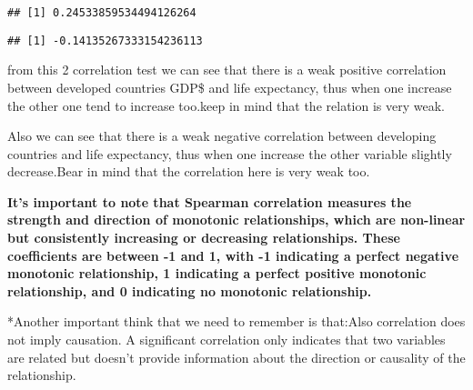 \documentclass[
]{article}
\newenvironment{Shaded}{\begin{snugshade}}{\end{snugshade}}
\newcommand{\AttributeTok}[1]{\textcolor[rgb]{0.13,0.29,0.53}{#1}}
\newcommand{\FunctionTok}[1]{\textcolor[rgb]{0.13,0.29,0.53}{\textbf{#1}}}
\newcommand{\NormalTok}[1]{#1}
\newcommand{\SpecialCharTok}[1]{\textcolor[rgb]{0.81,0.36,0.00}{\textbf{#1}}}
\newcommand{\StringTok}[1]{\textcolor[rgb]{0.31,0.60,0.02}{#1}}
\begin{document}
\begin{Shaded}
\end{Shaded}

\begin{verbatim}
## [1] 0.24533859534494126264
\end{verbatim}

\begin{Shaded}
\end{Shaded}

\begin{verbatim}
## [1] -0.14135267333154236113
\end{verbatim}

from this 2 correlation test we can see that there is a weak positive
correlation between developed countries GDP\$ and life expectancy, thus
when one increase the other one tend to increase too.keep in mind that
the relation is very weak.

Also we can see that there is a weak negative correlation between
developing countries and life expectancy, thus when one increase the
other variable slightly decrease.Bear in mind that the correlation here
is very weak too.

\textbf{It's important to note that Spearman correlation measures the
strength and direction of monotonic relationships, which are non-linear
but consistently increasing or decreasing relationships. These
coefficients are between -1 and 1, with -1 indicating a perfect negative
monotonic relationship, 1 indicating a perfect positive monotonic
relationship, and 0 indicating no monotonic relationship.}

*Another important think that we need to remember is that:Also
correlation does not imply causation. A significant correlation only
indicates that two variables are related but doesn't provide information
about the direction or causality of the relationship.
\end{document}
